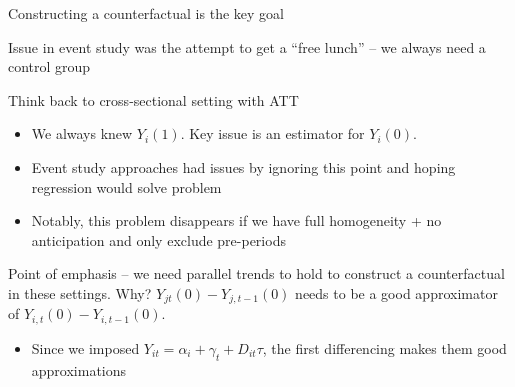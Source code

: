 \documentclass[notes,11pt, aspectratio=169]{beamer}
\newenvironment{wideitemize}{\itemize\addtolength{\itemsep}{10pt}}{\enditemize}
\begin{document}
\begin{frame}{Constructing a counterfactual is the key goal}
  \begin{wideitemize}
  \item Issue in event study was the attempt to get a ``free lunch''
    -- we always need a control group
  \item   Think back to cross-sectional setting with ATT
    \begin{itemize}
    \item We always knew $Y_{i}(1)$. Key issue is an estimator for $Y_{i}(0)$.
    \item Event study approaches had issues by ignoring this point and hoping regression would solve problem
    \item Notably, this problem disappears if we have full homogeneity + no anticipation and only exclude pre-periods
    \end{itemize}
  \item Point of emphasis -- we need parallel trends to hold to
    construct a counterfactual in these settings. Why?
    $Y_{jt}(0) - Y_{j,t-1}(0)$ needs to be a good approximator of
    $Y_{i,t}(0) - Y_{i,t-1}(0)$.
    \begin{itemize}
    \item Since we imposed
      $Y_{it} = \alpha_{i} + \gamma_{t} + D_{it}\tau$, the first
      differencing makes them good approximations
    \end{itemize}
  \end{wideitemize}
\end{frame}
\end{document}
